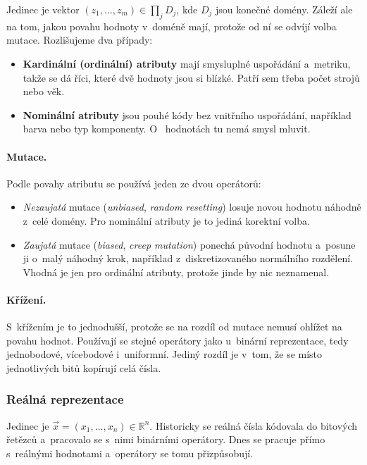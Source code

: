 \documentclass[11pt,a4paper]{article}
\theoremstyle{definition}
\begin{document}
Jedinec je vektor $(z_1,\dots,z_m) \in \prod_j D_j$, kde $D_j$ jsou konečné domény.
Záleží ale na tom, jakou povahu hodnoty v~doméně mají, protože od ní se odvíjí volba
mutace. Rozlišujeme dva případy:
\begin{itemize}
\item \textbf{Kardinální (ordinální) atributy} mají smysluplné uspořádání a~metriku,
  takže se dá říci, které dvě hodnoty jsou si blízké. Patří sem třeba počet strojů
  nebo věk.
\item \textbf{Nominální atributy} jsou pouhé kódy bez vnitřního uspořádání, například
  barva nebo typ komponenty. O~ hodnotách tu nemá smysl mluvit.
\end{itemize}

\paragraph{Mutace.} Podle povahy atributu se používá jeden ze dvou operátorů:
\begin{itemize}
\item \emph{Nezaujatá} mutace (\emph{unbiased}, \emph{random resetting}) losuje novou
  hodnotu náhodně z~celé domény. Pro nominální atributy je to jediná korektní volba.
\item \emph{Zaujatá} mutace (\emph{biased}, \emph{creep mutation}) ponechá původní
  hodnotu a~posune ji o~malý náhodný krok, například z~diskretizovaného normálního
  rozdělení. Vhodná je jen pro ordinální atributy, protože jinde by 
  nic neznamenal.
\end{itemize}

\paragraph{Křížení.} S~křížením je to jednodušší, protože se na rozdíl od mutace nemusí
ohlížet na povahu hodnot. Používají se stejné operátory jako u~binární reprezentace, tedy
jednobodové, vícebodové i~uniformní. Jediný rozdíl je v~tom, že se místo jednotlivých
bitů kopírují celá čísla.

\subsubsection{Reálná reprezentace}

Jedinec je $\vec{x} = (x_1,\dots,x_n) \in \mathbb{R}^n$. Historicky se reálná čísla
kódovala do bitových řetězců a~pracovalo se s~nimi binárními operátory. Dnes se pracuje
přímo s~reálnými hodnotami a~operátory se tomu přizpůsobují.
\end{document}

